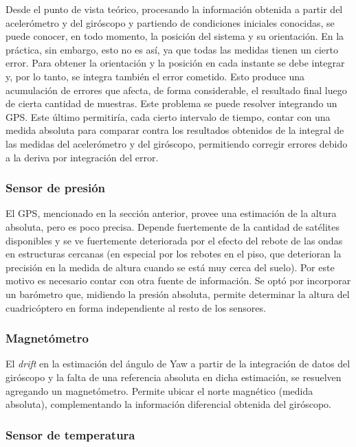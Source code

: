 \documentclass[main]{subfiles}
\begin{document}
Desde el punto de vista te\'orico, procesando la informaci\'on obtenida a partir del aceler\'ometro y del gir\'oscopo y partiendo de condiciones iniciales conocidas, se puede conocer, en todo momento, la posici\'on del sistema y su orientaci\'on. En la pr\'actica, sin embargo, esto no es as\'i, ya que todas las medidas tienen un cierto error. Para obtener la orientaci\'on y la posici\'on en cada instante se debe integrar y, por lo tanto, se integra tambi\'en el error cometido. Esto produce una acumulaci\'on de errores que afecta, de forma considerable, el resultado final luego de cierta cantidad de muestras. Este problema se puede resolver integrando un GPS. Este \'ultimo permitir\'ia, cada cierto intervalo de tiempo, contar con una medida absoluta para comparar contra los resultados obtenidos de la integral de las medidas del aceler\'ometro y del gir\'oscopo, permitiendo corregir errores debido a la deriva por integraci\'on del error.

\subsubsection{Sensor de presi\'on}

El GPS, mencionado en la secci\'on anterior, provee una estimaci\'on de la altura absoluta, pero es poco precisa. Depende fuertemente de la cantidad de sat\'elites disponibles y se ve fuertemente deteriorada por el efecto del rebote de las ondas en estructuras cercanas (en especial por los rebotes en el piso, que deterioran la precisi\'on en la medida de altura cuando se est\'a muy cerca del suelo). Por este motivo es necesario contar con otra fuente de informaci\'on. Se opt\'o por incorporar un bar\'ometro que, midiendo la presi\'on absoluta, permite determinar la altura del cuadric\'optero en forma independiente al resto de los sensores.

\subsubsection{Magnet\'ometro}

El \textit{drift} en la estimaci\'on del \'angulo de Yaw a partir de la integraci\'on de datos del gir\'oscopo y la falta de una referencia absoluta en dicha estimaci\'on, se resuelven agregando un magnet\'ometro. Permite ubicar el norte magn\'etico (medida absoluta), complementando la informaci\'on diferencial obtenida del gir\'oscopo.

\subsubsection{Sensor de temperatura}
\end{document}
